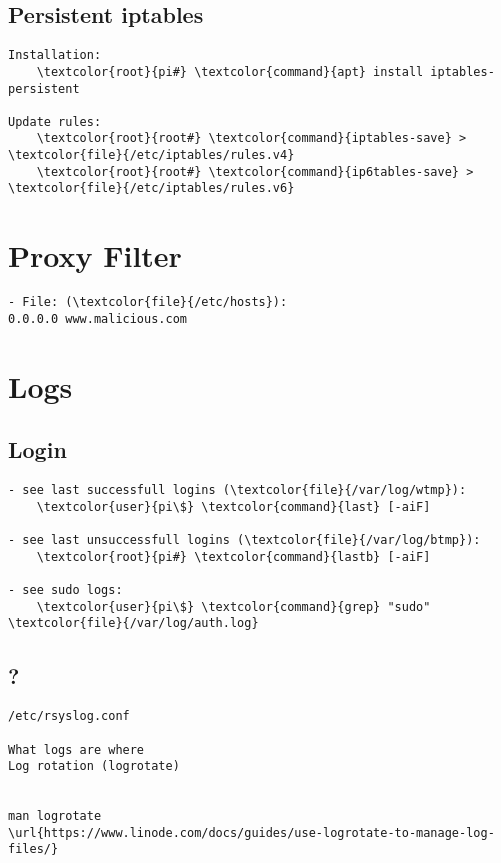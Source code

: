 \documentclass[10pt, a4paper, onecolumn, openany]{book} %
\begin{document}
\subsection{Persistent iptables}
\begin{Verbatim}[commandchars=\\\{\}]
Installation:
    \textcolor{root}{pi#} \textcolor{command}{apt} install iptables-persistent

Update rules:
    \textcolor{root}{root#} \textcolor{command}{iptables-save} > \textcolor{file}{/etc/iptables/rules.v4}
    \textcolor{root}{root#} \textcolor{command}{ip6tables-save} > \textcolor{file}{/etc/iptables/rules.v6}
\end{Verbatim}

\section{Proxy Filter}
\begin{Verbatim}[commandchars=\\\{\}]
- File: (\textcolor{file}{/etc/hosts}):
0.0.0.0 www.malicious.com
\end{Verbatim}

\section{Logs}
\subsection{Login}
\begin{Verbatim}[commandchars=\\\{\}]
- see last successfull logins (\textcolor{file}{/var/log/wtmp}):
    \textcolor{user}{pi\$} \textcolor{command}{last} [-aiF]

- see last unsuccessfull logins (\textcolor{file}{/var/log/btmp}):
    \textcolor{root}{pi#} \textcolor{command}{lastb} [-aiF]
    
- see sudo logs:
    \textcolor{user}{pi\$} \textcolor{command}{grep} "sudo" \textcolor{file}{/var/log/auth.log}
\end{Verbatim}

\subsection{?}
\begin{Verbatim}[commandchars=\\\{\}]
/etc/rsyslog.conf
    
What logs are where
Log rotation (logrotate)


man logrotate
\url{https://www.linode.com/docs/guides/use-logrotate-to-manage-log-files/}
\end{Verbatim}
\end{document}
